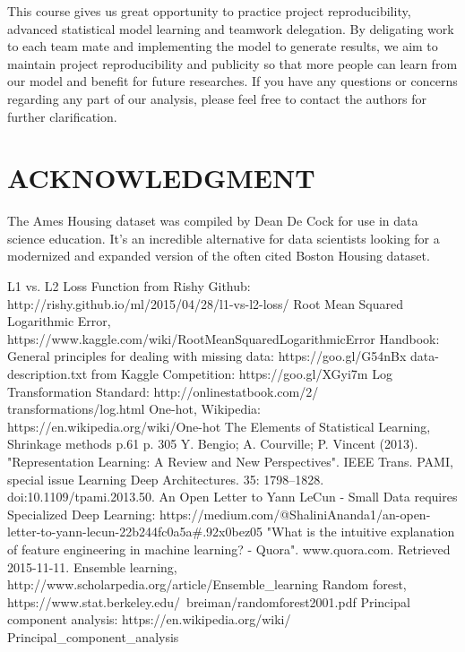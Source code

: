 \documentclass[letterpaper, 10 pt, conference]{ieeeconf}\usepackage[]{graphicx}\usepackage[]{color}
\begin{document}
This course gives us great opportunity to practice project reproducibility, advanced statistical model learning and teamwork delegation. By deligating work to each team mate and implementing the model to generate results, we aim to maintain project reproducibility and publicity so that more people can learn from our model and benefit for future researches. If you have any questions or concerns regarding any part of our analysis, please feel free to contact the authors for further clarification.

\addtolength{\textheight}{-12cm} 

\section*{ACKNOWLEDGMENT}

The Ames Housing dataset was compiled by Dean De Cock for use in data science education. It's an incredible alternative for data scientists looking for a modernized and expanded version of the often cited Boston Housing dataset.

\begin{thebibliography}{99}

 L1 vs. L2 Loss Function from Rishy Github: http://rishy.github.io/ml/2015/04/28/l1-vs-l2-loss/
 Root Mean Squared Logarithmic Error, https://www.kaggle.com/wiki/RootMeanSquaredLogarithmicError
 Handbook: General principles for dealing with missing data: https://goo.gl/G54nBx
 data-description.txt from Kaggle Competition: https://goo.gl/XGyi7m
 Log Transformation Standard: http://onlinestatbook.com/2/\newline
transformations/log.html
 One-hot, Wikipedia: https://en.wikipedia.org/wiki/One-hot
 The Elements of Statistical Learning, Shrinkage methods p.61  p. 305 
 Y. Bengio; A. Courville; P. Vincent (2013). "Representation Learning: A Review and New Perspectives". IEEE Trans. PAMI, special issue Learning Deep Architectures. 35: 1798–1828. doi:10.1109/tpami.2013.50.
 An Open Letter to Yann LeCun - Small Data requires Specialized Deep Learning: https://medium.com/@ShaliniAnanda1/an-open-letter-to-yann-lecun-22b244fc0a5a\#.92x0bez05
 "What is the intuitive explanation of feature engineering in machine learning? - Quora". www.quora.com. Retrieved 2015-11-11.
 Ensemble learning, http://www.scholarpedia.org/article/Ensemble\_learning
 Random forest, https://www.stat.berkeley.edu/~breiman/randomforest2001.pdf
 Principal component analysis: https://en.wikipedia.org/wiki/ \newline
Principal\_component\_analysis

\end{thebibliography}
\end{document}
